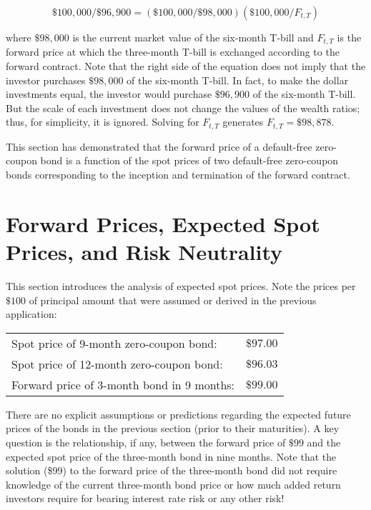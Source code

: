 \documentclass[11pt]{article}
\begin{document}
$$
\$ 100,000 / \$ 96,900=(\$ 100,000 / \$ 98,000)\left(\$ 100,000 / F_{t, T}\right)
$$

where $\$ 98,000$ is the current market value of the six-month T-bill and $F_{t, T}$ is the forward price at which the three-month T-bill is exchanged according to the forward contract. Note that the right side of the equation does not imply that the investor purchases $\$ 98,000$ of the six-month T-bill. In fact, to make the dollar investments equal, the investor would purchase $\$ 96,900$ of the six-month T-bill. But the scale of each investment does not change the values of the wealth ratios; thus, for simplicity, it is ignored. Solving for $F_{t, T}$ generates $F_{t, T}=\$ 98,878$.

This section has demonstrated that the forward price of a default-free zero-coupon bond is a function of the spot prices of two default-free zero-coupon bonds corresponding to the inception and termination of the forward contract.

\section*{Forward Prices, Expected Spot Prices, and Risk Neutrality}
This section introduces the analysis of expected spot prices. Note the prices per $\$ 100$ of principal amount that were assumed or derived in the previous application:

\begin{center}
\begin{tabular}{|lr|}
\hline
Spot price of 9-month zero-coupon bond: & $\$ 97.00$ \\
Spot price of 12-month zero-coupon bond: & $\$ 96.03$ \\
Forward price of 3-month bond in 9 months: & $\$ 99.00$ \\
\hline
\end{tabular}
\end{center}

There are no explicit assumptions or predictions regarding the expected future prices of the bonds in the previous section (prior to their maturities). A key question is the relationship, if any, between the forward price of $\$ 99$ and the expected spot price of the three-month bond in nine months. Note that the solution (\$99) to the forward price of the three-month bond did not require knowledge of the current three-month bond price or how much added return investors require for bearing interest rate risk or any other risk!
\end{document}
